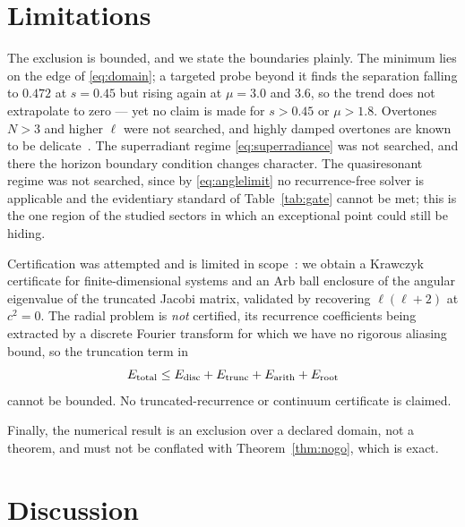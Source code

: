 \documentclass[aps,prd,reprint,superscriptaddress,nofootinbib,longbibliography]{revtex4-2}
\theoremstyle{plain}
\theoremstyle{definition}
\theoremstyle{remark}
\begin{document}
\section{Limitations}\label{sec:limits}

The exclusion is bounded, and we state the boundaries plainly. The minimum lies
on the edge of \eqref{eq:domain}; a targeted probe beyond it finds the
separation falling to $0.472$ at $s=0.45$ but rising again at $\mu=3.0$ and
$3.6$, so the trend does not extrapolate to zero --- yet no claim is made for
$s>0.45$ or $\mu>1.8$. Overtones $N>3$ and higher $\ell$ were not searched, and
highly damped overtones are known to be
delicate~\cite{Nollert1996C33,Miyachi2025C45}. The superradiant regime
\eqref{eq:superradiance} was not searched, and there the horizon boundary
condition changes character. The quasiresonant regime was not searched, since by
\eqref{eq:anglelimit} no recurrence-free solver is applicable and the
evidentiary standard of Table~\ref{tab:gate} cannot be met; this is the one
region of the studied sectors in which an exceptional point could still be
hiding.

Certification was attempted and is limited in
scope~\cite{MooreE73,TuckerE74,Breiding2020E69,Duff2024E70}: we obtain a
Krawczyk certificate for finite-dimensional systems and an Arb ball enclosure of
the angular eigenvalue of the truncated Jacobi matrix, validated by recovering
$\ell(\ell+2)$ at $c^2=0$. The radial problem is \emph{not} certified, its
recurrence coefficients being extracted by a discrete Fourier transform for which
we have no rigorous aliasing bound, so the truncation term in
\begin{equation}\label{eq:errorbudget}
  E_{\rm total}\le E_{\rm disc}+E_{\rm trunc}+E_{\rm arith}+E_{\rm root}
\end{equation}
cannot be bounded. No truncated-recurrence or continuum certificate is claimed.

Finally, the numerical result is an exclusion over a declared domain, not a
theorem, and must not be conflated with Theorem~\ref{thm:nogo}, which is exact.

\section{Discussion}\label{sec:discussion}
\end{document}
